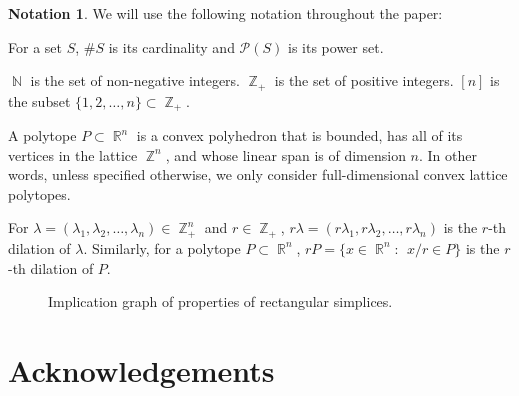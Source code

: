 \documentclass[a4paper,11pt]{amsart}
\theoremstyle{plain}
\theoremstyle{definition}
\newtheorem{notation}[theorem]{Notation}
\theoremstyle{remark}
\DeclareMathOperator{\NN}{\mathbb{N}}
\DeclareMathOperator{\ZZ}{\mathbb{Z}}
\DeclareMathOperator{\RR}{\mathbb{R}}
\DeclareMathOperator{\LPE}{LPE}
\begin{document}
\begin{notation}
    We will use the following notation throughout the paper:
    
    For a set $S$, $\# S$ is its cardinality and $\mathcal{P}(S)$ is its power set.
    
    $\NN$ is the set of non-negative integers. $\ZZ_+$ is the set of positive integers. $[n]$ is the subset $\{1, 2, \ldots, n\} \subset \ZZ_+$.

    A polytope $P \subset \RR^n$ is a convex polyhedron that is bounded, has all of its vertices in the lattice $\ZZ^n$, and whose linear span is of dimension $n$. In other words, unless specified otherwise, we only consider full-dimensional convex lattice polytopes.
    
    For $\lambda = (\lambda_1, \lambda_2, \ldots, \lambda_n) \in \ZZ_+^n$ and $r \in \ZZ_+$, $r\lambda = (r\lambda_1, r\lambda_2, \ldots, r\lambda_n)$ is the $r$-th dilation of $\lambda$. Similarly, for a polytope $P \subset \RR^n$, $rP = \{x \in \RR^n:~~x/r \in P\}$ is the $r$-th dilation of $P$.
\end{notation}

\begin{figure}[ht]
    \centering
    \caption{Implication graph of properties of rectangular simplices.}
    \label{fig:implications}
\end{figure}

\section*{Acknowledgements}
\end{document}
